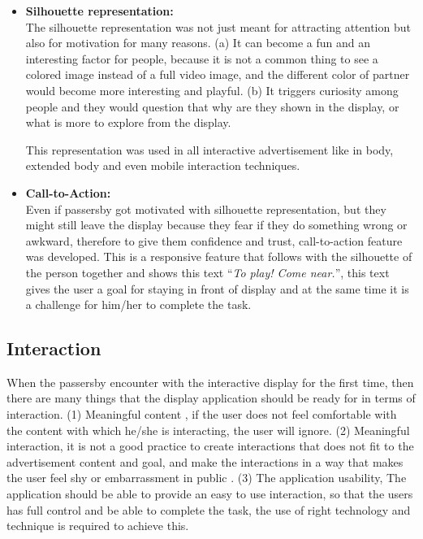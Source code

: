 \begin{itemize}

\item \textbf{Silhouette representation:}\\
The silhouette representation was not just meant for attracting attention but also for motivation for many reasons. (a) It can become a fun and an interesting factor for people, because it is not a common thing to see a colored image instead of a full video image, and the different color of partner would become more interesting and playful. (b) It triggers curiosity among people and they would question that why are they shown in the display, or what is more to explore from the display. 

This representation was used in all interactive advertisement like in body, extended body and even mobile interaction techniques.

\item \textbf{Call-to-Action:} \\
Even if passersby got motivated with silhouette representation, but they might still leave the display because they fear if they do something wrong or awkward, therefore to give them confidence and trust, call-to-action feature was developed. This is a responsive feature that follows with the silhouette of the person together and shows this text ``\emph{To play! Come near.}'', this text gives the user a goal for staying in front of display and at the same time it is a challenge for him/her to complete the task.

\end{itemize}


\subsection{Interaction}
When the passersby encounter with the interactive display for the first time, then there are many things that the display application should be ready for in terms of interaction. (1) Meaningful content \cite{ Meaningful_ad}, if the user does not feel comfortable with the content with which he/she is interacting, the user will ignore. (2) Meaningful interaction, it is not a good practice to create interactions that does not fit to the advertisement content and goal, and make the interactions in a way that makes the user feel shy or embarrassment in public \cite{EnticingPeople}. (3) The application usability,  The application should be able to provide an easy to use interaction, so that the users has full control and be able to complete the task, the use of right technology and technique is required to achieve this.

